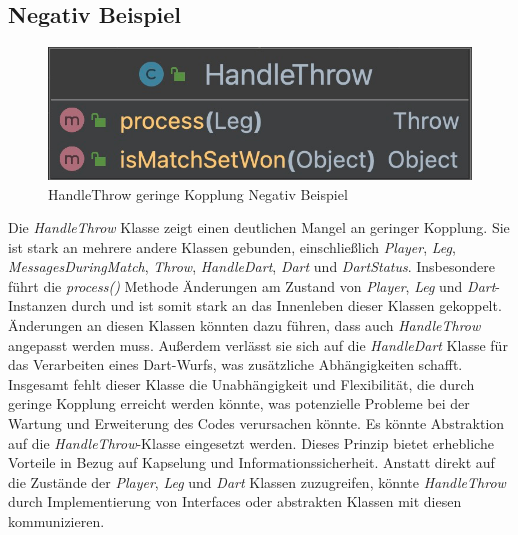 \subsection{Negativ Beispiel}
\begin{figure}[ht]
    \centering
    \includegraphics[width=0.7\linewidth]{Bilder/HandleThrowUML.png}
    \caption{HandleThrow geringe Kopplung Negativ Beispiel}
    \label{fig:handlethrow-uml}
\end{figure}
Die \textit{HandleThrow} Klasse zeigt einen deutlichen Mangel an geringer Kopplung. Sie ist stark an mehrere andere Klassen gebunden, einschließlich \textit{Player}, \textit{Leg}, \textit{MessagesDuringMatch}, \textit{Throw}, \textit{HandleDart}, \textit{Dart} und \textit{DartStatus}. Insbesondere führt die \textit{process()} Methode Änderungen am Zustand von \textit{Player}, \textit{Leg} und \textit{Dart}-Instanzen durch und ist somit stark an das Innenleben dieser Klassen gekoppelt. Änderungen an diesen Klassen könnten dazu führen, dass auch \textit{HandleThrow} angepasst werden muss. Außerdem verlässt sie sich auf die \textit{HandleDart} Klasse für das Verarbeiten eines Dart-Wurfs, was zusätzliche Abhängigkeiten schafft. Insgesamt fehlt dieser Klasse die Unabhängigkeit und Flexibilität, die durch geringe Kopplung erreicht werden könnte, was potenzielle Probleme bei der Wartung und Erweiterung des Codes verursachen könnte. 
Es könnte Abstraktion auf die \textit{HandleThrow}-Klasse eingesetzt werden. Dieses Prinzip bietet erhebliche Vorteile in Bezug auf Kapselung und Informationssicherheit. Anstatt direkt auf die Zustände der \textit{Player}, \textit{Leg} und \textit{Dart} Klassen zuzugreifen, könnte \textit{HandleThrow} durch Implementierung von Interfaces oder abstrakten Klassen mit diesen kommunizieren. 
